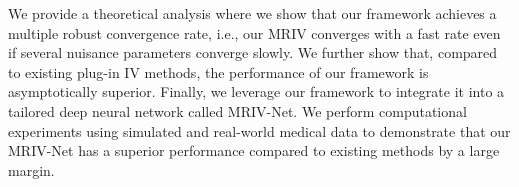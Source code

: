\documentclass[nonatbib]{article}
\newcommand{\frameworkname}{MRIV\xspace}
\newcommand{\modelname}{\mbox{MRIV-Net}\xspace}
\theoremstyle{definition}
\theoremstyle{plain}
\begin{document}
We provide a theoretical analysis where we show that our framework achieves a multiple robust convergence rate, i.e., our \frameworkname converges with a fast rate even if several nuisance parameters converge slowly. We further show that, compared to existing plug-in IV methods, the performance of our framework is asymptotically superior. Finally, we leverage our framework to integrate it into a tailored deep neural network called \modelname. We perform computational experiments using simulated and real-world medical data to demonstrate that our \modelname has a superior performance compared to existing methods by a large margin. 



\end{document}
